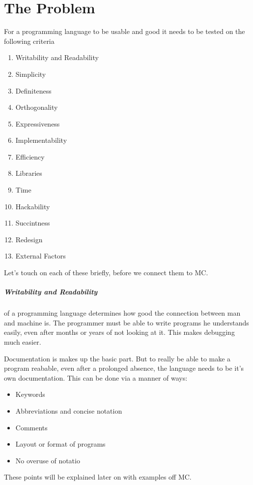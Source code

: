\chapter{The Problem}
For a programming language to be usable and good it needs to be tested on  the following criteria\cite{khedker1997makes,graham2004hackers}
\begin{enumerate}
  \item Writability and Readability
  \item Simplicity
  \item Definiteness
  \item Orthogonality
  \item Expressiveness
  \item Implementability
  \item Efficiency
  \item Libraries
  \item Time
  \item Hackability
  \item Succintness
  \item Redesign
  \item External Factors
\end{enumerate}

Let's touch on each of these briefly, before we connect them to MC.
\paragraph{Writability and Readability}
of a programming language determines how good the connection between man and machine is. The programmer must be able to write programs he understands easily, even after months or years of not looking at it. This makes debugging much easier.

Documentation is makes up the basic part. But to really be able to make a program reabable, even after a prolonged absence, the language needs to be it's own documentation. This can be done via a manner of ways:
\begin{itemize}
  \item Keywords
  \item Abbreviations and concise notation
  \item Comments
  \item Layout or format of programs
  \item No overuse of notatio
\end{itemize}
These points will be explained later on with examples off MC.\cite{}

